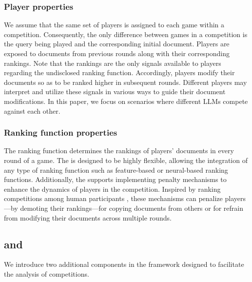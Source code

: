 
\subsubsection{Player properties}\label{platform_agent_properties}
We assume that the same set of players is assigned to each game within a competition. Consequently, the only difference between games in a competition is the query being played and the corresponding initial document.
Players are exposed to documents from previous rounds along with their corresponding rankings. Note that the rankings are the only signals available to players regarding the undisclosed ranking function. Accordingly, players modify their documents so as to be ranked higher in subsequent rounds. Different players may interpret and utilize these signals in various ways to guide their document modifications. In this paper, we focus on scenarios where different LLMs compete against each other. 

\subsubsection{Ranking function properties} \label{platform_ranking_properties}
The ranking function determines the rankings of players' documents in every round of a game. The {\platformName} {\platform} is designed to be highly flexible, allowing the integration of any type of ranking function such as feature-based or neural-based ranking functions.
Additionally, the {\platformName} {\platform} supports implementing penalty mechanisms to enhance the dynamics of players in the competition. Inspired by ranking competitions among human participants \cite{mordo_search_2025, raifer_information_2017, nachimovsky_ranking-incentivized_2024}, these mechanisms can penalize players—by demoting their rankings—for copying documents from others or for refrain from modifying their documents across multiple rounds.


\subsection{{\platformName} {\analyzer} and {\platformName} {\compare}}
We introduce two additional components in the {\platformName} framework designed to facilitate the analysis of competitions.


